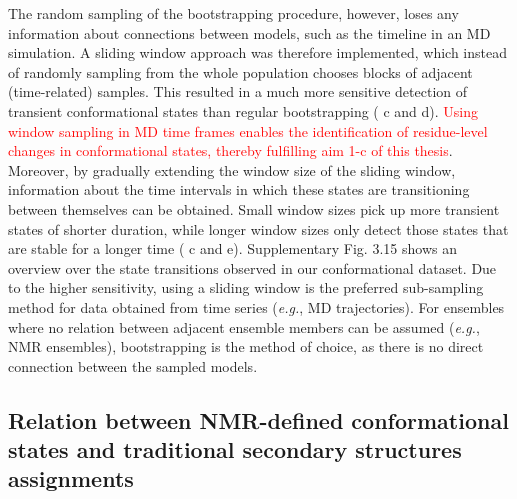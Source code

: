 The random sampling of the bootstrapping procedure, however, loses any information about connections between models, such as the timeline in an MD simulation. A sliding window approach was therefore implemented, which instead of randomly sampling from the whole population chooses blocks of adjacent (time-related) samples. This resulted in a much more sensitive detection of transient conformational states than regular bootstrapping ( c and d). \textcolor{red}{Using window sampling in MD time frames enables the identification of residue-level changes in conformational states, thereby fulfilling aim 1-c of this thesis}. Moreover, by gradually extending the window size of the sliding window, information about the time intervals in which these states are transitioning between themselves can be obtained. Small window sizes pick up more transient states of shorter duration, while longer window sizes only detect those states that are stable for a longer time ( c and e). 
Supplementary Fig. 3.15 shows an overview over the state transitions observed in our conformational dataset. Due to the higher sensitivity, using a sliding window is the preferred sub-sampling method for data obtained from time series (\textit{e.g.}, MD trajectories). For ensembles where no relation between adjacent ensemble members can be assumed (\textit{e.g.}, NMR ensembles), bootstrapping is the method of choice, as there is no direct connection between the sampled models.

\subsection{Relation between NMR-defined conformational states and traditional secondary structures assignments} 
\label{section:DSSP_vs_constava}


